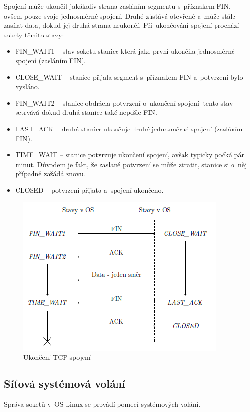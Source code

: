 Spojení může ukončit jakákoliv strana zasláním segmentu s~příznakem FIN, ovšem pouze svoje jednosměrné spojení. Druhé zůstává otevřené a~může stále zasílat data, dokud jej druhá strana neukončí. Při~ukončování spojení prochází sokety těmito stavy:
\begin{itemize}[noitemsep]
	\item FIN\_WAIT1 -- stav soketu stanice která jako první ukončila jednosměrné spojení (zasláním FIN).
	\item CLOSE\_WAIT -- stanice přijala segment s~příznakem FIN a~potvrzení bylo vysláno.
	\item FIN\_WAIT2 -- stanice obdržela potvrzení o~ukončení spojení, tento stav setrvává dokud druhá stanice také nepošle FIN.
	\item LAST\_ACK -- druhá stanice ukončuje druhé jednosměrné spojení (zasláním FIN).
	\item TIME\_WAIT -- stanice potvrzuje ukončení spojení, avšak typicky počká pár minut. Důvodem je fakt, že zaslané potvrzení se může ztratit, stanice si o~něj případně zažádá znovu.
	\item CLOSED -- potvrzení přijato a~spojení ukončeno.
\end{itemize}

\begin{figure}
	\centering
	\includegraphics[scale=1]{images/network_tcp_close.png}
	\caption{Ukončení TCP spojení}
	\label{network_tcp_close}
\end{figure}

\subsection{Síťová systémová volání}

Správa soketů v~OS Linux se provádí pomocí systémových volání.

